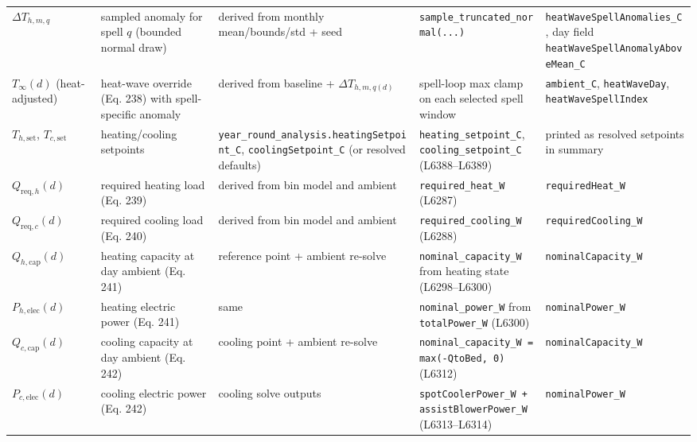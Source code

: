 \documentclass[11pt]{article}
\begin{document}
\begin{longtable}{p{}p{}p{}p{}p{}}
$\Delta T_{h,m,q}$ & sampled anomaly for spell $q$ (bounded normal draw) & derived from monthly mean/bounds/std + seed & \texttt{sample\_truncated\_normal(...)} & \texttt{heatWaveSpellAnomalies\_C}, day field \texttt{heatWaveSpellAnomalyAboveMean\_C} \\

$T_\infty(d)$ (heat-adjusted) & heat-wave override (Eq. 238) with spell-specific anomaly & derived from baseline + $\Delta T_{h,m,q(d)}$ & spell-loop max clamp on each selected spell window & \texttt{ambient\_C}, \texttt{heatWaveDay}, \texttt{heatWaveSpellIndex} \\

$T_{h,\mathrm{set}}$, $T_{c,\mathrm{set}}$ & heating/cooling setpoints & \texttt{year\_round\_analysis.heatingSetpoint\_C}, \texttt{coolingSetpoint\_C} (or resolved defaults) & \texttt{heating\_setpoint\_C}, \texttt{cooling\_setpoint\_C} (L6388--L6389) & printed as resolved setpoints in summary \\

$Q_{\mathrm{req},h}(d)$ & required heating load (Eq. 239) & derived from bin model and ambient & \texttt{required\_heat\_W} (L6287) & \texttt{requiredHeat\_W} \\

$Q_{\mathrm{req},c}(d)$ & required cooling load (Eq. 240) & derived from bin model and ambient & \texttt{required\_cooling\_W} (L6288) & \texttt{requiredCooling\_W} \\

$Q_{h,\mathrm{cap}}(d)$ & heating capacity at day ambient (Eq. 241) & reference point + ambient re-solve & \texttt{nominal\_capacity\_W} from heating state (L6298--L6300) & \texttt{nominalCapacity\_W} \\

$P_{h,\mathrm{elec}}(d)$ & heating electric power (Eq. 241) & same & \texttt{nominal\_power\_W} from \texttt{totalPower\_W} (L6300) & \texttt{nominalPower\_W} \\

$Q_{c,\mathrm{cap}}(d)$ & cooling capacity at day ambient (Eq. 242) & cooling point + ambient re-solve & \texttt{nominal\_capacity\_W = max(-QtoBed, 0)} (L6312) & \texttt{nominalCapacity\_W} \\

$P_{c,\mathrm{elec}}(d)$ & cooling electric power (Eq. 242) & cooling solve outputs & \texttt{spotCoolerPower\_W + assistBlowerPower\_W} (L6313--L6314) & \texttt{nominalPower\_W} \\


\end{longtable}
\end{document}

